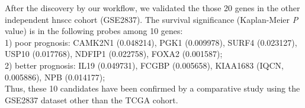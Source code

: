 \documentclass[12pt, a4paper]{article}
\newcommand{\bcaption}[2]{\caption{\textbf{#1} #2}}
\begin{document}
After the discovery by our workflow, we validated the those 20 genes in the other independent \acrshort{hnscc} cohort (GSE2837).
The survival significance (Kaplan-Meier \textit{P} value) is in the following probes among 10 genes:\\
1) poor prognosis: CAMK2N1 (0.048214), PGK1 (0.009978), SURF4 (0.023127), USP10 (0.017768), NDFIP1 (0.022758), FOXA2 (0.001587);\\ %
2) better prognosis: IL19 (0.049731), FCGBP (0.005658), KIAA1683 (IQCN, 0.005886), NPB (0.014177);\\
Thus, these 10 candidates have been confirmed by a comparative study using the GSE2837 dataset other than the TCGA cohort.



\begin{figure}[hp]
\centering
\label{fig:figure2}
\end{figure}

\end{document}
